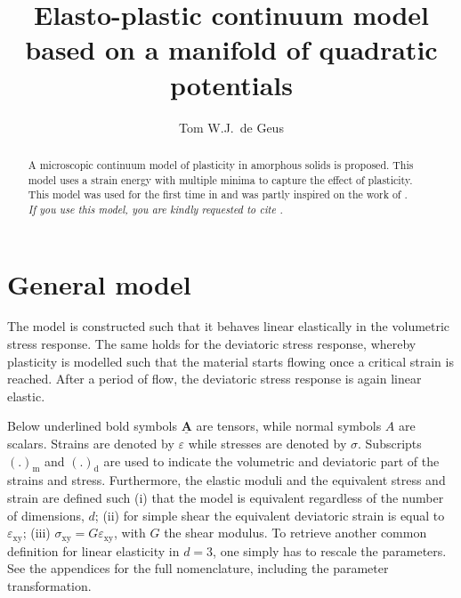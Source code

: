 \documentclass[fleqn]{goose-article}
\title{%
    Elasto-plastic continuum model
    based on a manifold of quadratic potentials
}
\author{Tom W.J.\ de Geus}
\newcommand\T[1]{\underline{\bm{{#1}}}}
\begin{document}
\maketitle

\begin{abstract}
\noindent
A microscopic continuum model of plasticity in amorphous solids is proposed.
This model uses a strain energy with multiple minima to capture the effect of plasticity.
This model was used for the first time in \citet{DeGeus2019}
and was partly inspired on the work of \citet{Jagla2017}.
\\

\noindent
\emph{If you use this model, you are kindly requested to cite \cite{DeGeus2019}.}
\\

\end{abstract}

\setcounter{tocdepth}{3}
\tableofcontents

\vfill\newpage
\section{General model}

The model is constructed such that it behaves linear elastically in the volumetric stress response.
The same holds for the deviatoric stress response, whereby plasticity is modelled
such that the material starts flowing once a critical strain is reached.
After a period of flow, the deviatoric stress response is again linear elastic.

Below underlined bold symbols $\T{A}$ are tensors, while normal symbols $A$ are scalars.
Strains are denoted by $\varepsilon$ while stresses are denoted by $\sigma$.
Subscripts $(.)_\mathrm{m}$ and $(.)_\mathrm{d}$ are used to indicate the
volumetric and deviatoric part of the strains and stress.
Furthermore, the elastic moduli and the equivalent stress and strain are defined such
(i) that the model is equivalent regardless of the number of dimensions, $d$;
(ii) for simple shear the equivalent deviatoric strain is equal to $\varepsilon_\mathrm{xy}$;
(iii) $\sigma_\mathrm{xy} = G \varepsilon_\mathrm{xy}$, with $G$ the shear modulus.
To retrieve another common definition for linear elasticity in $d = 3$,
one simply has to rescale the parameters.
See the appendices for the full nomenclature, including the parameter transformation.
\end{document}
